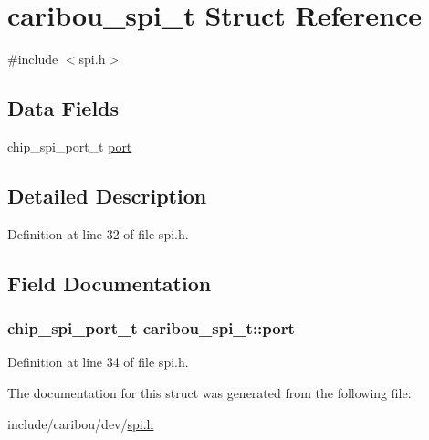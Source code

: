 \hypertarget{structcaribou__spi__t}{\section{caribou\-\_\-spi\-\_\-t Struct Reference}
\label{structcaribou__spi__t}
}


{\ttfamily \#include $<$spi.\-h$>$}

\subsection*{Data Fields}
\begin{DoxyCompactItemize}
\item 
chip\-\_\-spi\-\_\-port\-\_\-t \hyperlink{structcaribou__spi__t_ae1a7630daa892755a8a38a6e9cc8061c}{port}
\end{DoxyCompactItemize}


\subsection{Detailed Description}


Definition at line 32 of file spi.\-h.



\subsection{Field Documentation}
\hypertarget{structcaribou__spi__t_ae1a7630daa892755a8a38a6e9cc8061c}{
\subsubsection[{port}]{\setlength{\rightskip}{0pt plus 5cm}chip\-\_\-spi\-\_\-port\-\_\-t caribou\-\_\-spi\-\_\-t\-::port}}\label{structcaribou__spi__t_ae1a7630daa892755a8a38a6e9cc8061c}


Definition at line 34 of file spi.\-h.



The documentation for this struct was generated from the following file\-:\begin{DoxyCompactItemize}
\item 
include/caribou/dev/\hyperlink{spi_8h}{spi.\-h}\end{DoxyCompactItemize}
